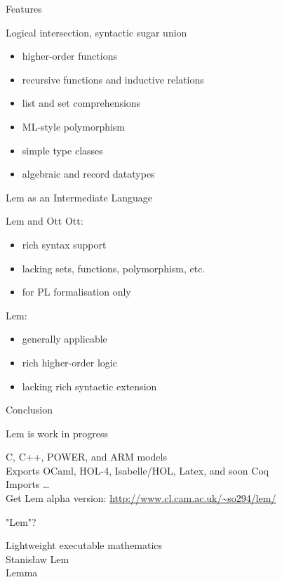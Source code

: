 \documentclass[pdf,nototal]{prosper}
\begin{document}
\begin{slide}{Features}

\begin{center}Logical intersection, syntactic sugar union\end{center}
\vspace{24pt}
\begin{itemize}
\item higher-order functions
\item recursive functions and inductive relations
\item list and set comprehensions
\item ML-style polymorphism
\item simple type classes
\item algebraic and record datatypes
\end{itemize}

\end{slide}

\begin{slide}{Lem as an Intermediate Language}
\[\]
\end{slide}

\begin{slide}{Lem and Ott}
Ott: 
\begin{itemize}
\item rich syntax support
\item lacking sets, functions, polymorphism, etc.
\item for PL formalisation only
\end{itemize}

\vspace{12pt}

Lem:
\begin{itemize}
\item generally applicable
\item rich higher-order logic
\item lacking rich syntactic extension
\end{itemize}
\end{slide}

\begin{slide}{Conclusion}

\begin{center}Lem is work in progress\end{center}

\vspace{24pt}

C, C++, POWER, and ARM models\\[12pt]

Exports OCaml, HOL-4, Isabelle/HOL, Latex, and soon Coq\\[12pt]

Imports \ldots\\[24pt]



Get Lem alpha version: \url{http://www.cl.cam.ac.uk/~so294/lem/}

\end{slide}

\begin{slide}{"Lem"?}

Lightweight executable mathematics\\[24pt]

Stanis\l{}aw Lem\\[24pt]

Lemma

\end{slide}
\end{document}
